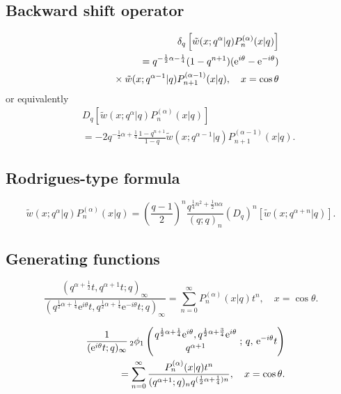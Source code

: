 \documentclass[envcountchap,graybox]{svmono}
\newcommand{\qhyp}[5]{\mbox{}_{#1}{\phi}_{#2}
\left(\genfrac{}{}{0pt}{}{#3}{#4}\,;\,q,\,#5\right)}
\newcommand{\mathindent}{\hspace{7.5mm}}
\newcommand{\e}{\textrm{e}}
\begin{document}
\subsection*{Backward shift operator}
\begin{eqnarray}
\label{shift2ContqLaguerreI}
& &\delta_q\left[{\tilde w}(x;q^{\alpha}|q)P_n^{(\alpha)}(x|q)\right]\nonumber\\
& &{}=q^{-\frac{1}{2}\alpha-\frac{1}{4}}(1-q^{n+1})(\e^{i\theta}-\e^{-i\theta})\nonumber\\
& &{}\mathindent{}\times
{\tilde w}(x;q^{\alpha-1}|q)P_{n+1}^{(\alpha-1)}(x|q),\quad x=\cos\theta
\end{eqnarray}
or equivalently
\begin{eqnarray}
\label{shift2ContqLaguerreII}
& &D_q\left[{\tilde w}(x;q^{\alpha}|q)P_n^{(\alpha)}(x|q)\right]\nonumber\\
& &{}=-2q^{-\frac{1}{2}\alpha+\frac{1}{4}}\frac{1-q^{n+1}}{1-q}
{\tilde w}(x;q^{\alpha-1}|q)P_{n+1}^{(\alpha-1)}(x|q).
\end{eqnarray}

\subsection*{Rodrigues-type formula}
\begin{equation}
\label{RodContqLaguerre}
{\tilde w}(x;q^{\alpha}|q)P_n^{(\alpha)}(x|q)=\left(\frac{q-1}{2}\right)^n
\frac{q^{\frac{1}{4}n^2+\frac{1}{2}n\alpha}}{(q;q)_n}
\left(D_q\right)^n\left[{\tilde w}(x;q^{\alpha+n}|q)\right].
\end{equation}

\subsection*{Generating functions}
\begin{equation}
\label{GenContqLaguerre1}
\frac{(q^{\alpha+\frac{1}{2}}t,q^{\alpha+1}t;q)_{\infty}}
{(q^{\frac{1}{2}\alpha+\frac{1}{4}}\e^{i\theta}t,q^{\frac{1}{2}\alpha+\frac{1}{4}}\e^{-i\theta}t;q)_{\infty}}
=\sum_{n=0}^{\infty}P_n^{(\alpha)}(x|q)t^n,\quad x=\cos\theta.
\end{equation}

\begin{eqnarray}
\label{GenContqLaguerre2}
& &\frac{1}{(\e^{i\theta}t;q)_{\infty}}\,\qhyp{2}{1}{q^{\frac{1}{2}\alpha+\frac{1}{4}}\e^{i\theta},
q^{\frac{1}{2}\alpha+\frac{3}{4}}\e^{i\theta}}{q^{\alpha+1}}{\e^{-i\theta}t}\nonumber\\
& &{}=\sum_{n=0}^{\infty}\frac{P_n^{(\alpha)}(x|q)t^n}{(q^{\alpha+1};q)_nq^{(\frac{1}{2}\alpha+\frac{1}{4})n}},
\quad x=\cos\theta.
\end{eqnarray}
\end{document}
